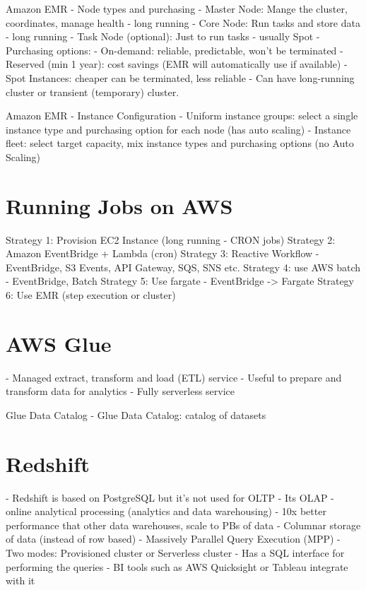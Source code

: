 \documentclass[11pt]{book}
\begin{document}
    Amazon EMR - Node types and purchasing
    - Master Node: Mange the cluster, coordinates, manage health - long running
    - Core Node: Run tasks and store data - long running
    - Task Node (optional): Just to run tasks - usually Spot
    - Purchasing options:
        - On-demand: reliable, predictable, won't be terminated
        - Reserved (min 1 year): cost savings (EMR will automatically use if available)
        - Spot Instances: cheaper can be terminated, less reliable
    - Can have long-running cluster or transient (temporary) cluster.

    Amazon EMR - Instance Configuration
    - Uniform instance groups: select a single instance type and purchasing option for each node (has auto scaling)
    - Instance fleet: select target capacity, mix instance types and purchasing options (no Auto Scaling)

    \section{Running Jobs on AWS}
    Strategy 1: Provision EC2 Instance (long running - CRON jobs)
    Strategy 2: Amazon EventBridge + Lambda (cron)
    Strategy 3: Reactive Workflow - EventBridge, S3 Events, API Gateway, SQS, SNS etc.
    Strategy 4: use AWS batch - EventBridge, Batch
    Strategy 5: Use fargate - EventBridge -> Fargate
    Strategy 6: Use EMR (step execution or cluster)

    \section{AWS Glue}
    - Managed extract, transform and load (ETL) service
    - Useful to prepare and transform data for analytics
    - Fully serverless service

    Glue Data Catalog
    - Glue Data Catalog: catalog of datasets

    \section{Redshift}
    - Redshift is based on PostgreSQL but it's not used for OLTP
    - Its OLAP - online analytical processing (analytics and data warehousing)
    - 10x better performance that other data warehouses, scale to PBs of data
    - Columnar storage of data (instead of row based)
    - Massively Parallel Query Execution (MPP)
    - Two modes: Provisioned cluster or Serverless cluster
    - Has a SQL interface for performing the queries
    - BI tools such as AWS Quicksight or Tableau integrate with it
\end{document}
